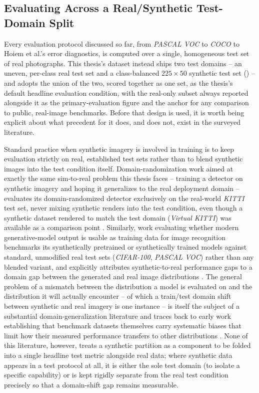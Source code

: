\subsection{Evaluating Across a Real/Synthetic Test-Domain Split}\label{sec:lit_real_synthetic_evaluation}

Every evaluation protocol discussed so far, from \textit{PASCAL VOC} to \textit{COCO} to Hoiem et al.'s error diagnostics, is computed over a single, homogeneous test set of real photographs. This thesis's dataset instead ships two test domains -- an uneven, per-class real test set and a class-balanced $225\times50$ synthetic test set () -- and  adopts the union of the two, scored together as one set, as the thesis's default headline evaluation condition, with the real-only subset always reported alongside it as the primary-evaluation figure and the anchor for any comparison to public, real-image benchmarks. Before that design is used, it is worth being explicit about what precedent for it does, and does not, exist in the surveyed literature.

Standard practice when synthetic imagery is involved in training is to keep evaluation strictly on real, established test sets rather than to blend synthetic images into the test condition itself. Domain-randomization work aimed at exactly the same sim-to-real problem this thesis faces -- training a detector on synthetic imagery and hoping it generalizes to the real deployment domain -- evaluates its domain-randomized detector exclusively on the real-world \textit{KITTI} test set, never mixing synthetic renders into the test condition, even though a synthetic dataset rendered to match the test domain (\textit{Virtual KITTI}) was available as a comparison point \cite{tremblayTrainingDeepNetworks2018}. Similarly, work evaluating whether modern generative-model output is usable as training data for image recognition benchmarks its synthetically pretrained or synthetically trained models against standard, unmodified real test sets (\textit{CIFAR-100}, \textit{PASCAL VOC}) rather than any blended variant, and explicitly attributes synthetic-to-real performance gaps to a domain gap between the generated and real image distributions \cite{heSyntheticDataGenerative2023}. The general problem of a mismatch between the distribution a model is evaluated on and the distribution it will actually encounter -- of which a train/test domain shift between synthetic and real imagery is one instance -- is itself the subject of a substantial domain-generalization literature \cite{zhouDomainGeneralizationSurvey2023} and traces back to early work establishing that benchmark datasets themselves carry systematic biases that limit how their measured performance transfers to other distributions \cite{UnbiasedLookDataset}. None of this literature, however, treats a synthetic partition as a component to be folded into a single headline test metric alongside real data; where synthetic data appears in a test protocol at all, it is either the sole test domain (to isolate a specific capability) or is kept rigidly separate from the real test condition precisely so that a domain-shift gap remains measurable.


